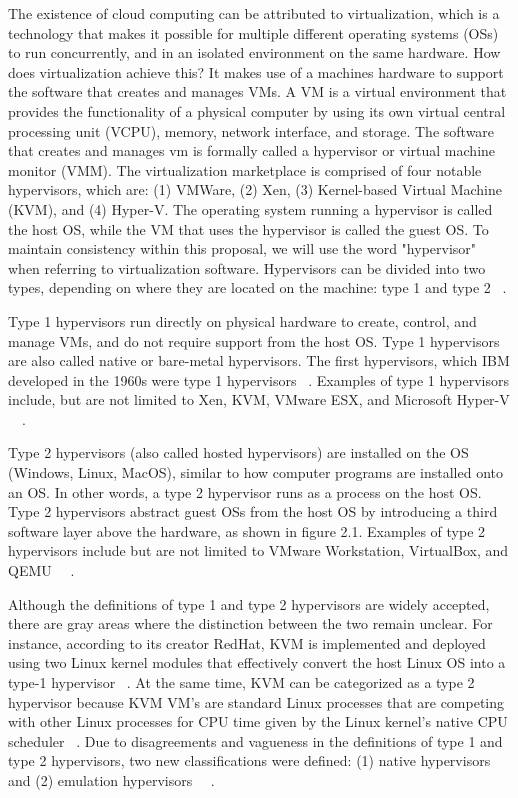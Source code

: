 \documentclass[12pt]{report}
\begin{document}
\begin{doublespace}
The existence of cloud computing can be attributed to virtualization, which is a technology that makes it possible for multiple different operating systems (OSs) to run concurrently, and in an isolated environment on the same hardware. How does virtualization achieve this? It makes use of a machines hardware to support the software that creates and manages VMs. A VM is a virtual environment that provides the functionality of a physical computer by using its own virtual central processing unit (VCPU), memory, network interface, and storage. The software that creates and manages vm is formally called a hypervisor or virtual machine monitor (VMM). The virtualization marketplace is comprised of four notable hypervisors, which are: (1) VMWare, (2) Xen, (3) Kernel-based Virtual Machine (KVM), and (4) Hyper-V. The operating system running a hypervisor is called the host OS, while the VM that uses the hypervisor is called the guest OS. To maintain consistency within this proposal, we will use the word "hypervisor" when referring to virtualization software. Hypervisors can be divided into two types, depending on where they are located on the machine: type 1 and type 2 ~\cite{patel2025hypervisor}.

Type 1 hypervisors run directly on physical hardware to create, control, and manage VMs, and do not require support from the host OS. Type 1 hypervisors are also called native or bare-metal hypervisors. The first hypervisors, which IBM developed in the 1960s were type 1 hypervisors ~\cite{meier2008ibm}. Examples of type 1 hypervisors include, but are not limited to Xen, KVM, VMware ESX, and Microsoft Hyper-V ~\cite{bauman2015survey}~\cite{patel2025hypervisor}.

Type 2 hypervisors (also called hosted hypervisors) are installed on the OS (Windows, Linux, MacOS), similar to how computer programs are installed onto an OS. In other words, a type 2 hypervisor runs as a process on the host OS. Type 2 hypervisors abstract guest OSs from the host OS by introducing a third software layer above the hardware, as shown in figure 2.1. Examples of type 2 hypervisors include but are not limited to VMware Workstation, VirtualBox, and QEMU ~\cite{bauman2015survey}~\cite{patel2025hypervisor}.

Although the definitions of type 1 and type 2 hypervisors are widely accepted, there are gray areas where the distinction between the two remain unclear. For instance, according to its creator RedHat, KVM is implemented and deployed using two Linux kernel modules that effectively convert the host Linux OS into a type-1 hypervisor ~\cite{graziano2011performance}. At the same time, KVM can be categorized as a type 2 hypervisor because KVM VM's are standard Linux processes that are competing with other Linux processes for CPU time given by the Linux kernel's native CPU scheduler ~\cite{kvmcpuschedule}. Due to disagreements and vagueness in the definitions of type 1 and type 2 hypervisors, two new classifications were defined: (1) native hypervisors and (2) emulation hypervisors ~\cite{10.1145/2775111}~\cite{patel2025hypervisor}.


\end{doublespace}
\end{document}
